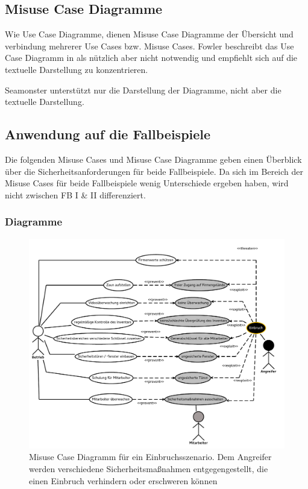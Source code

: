 \subsection{Misuse Case Diagramme}
Wie Use Case Diagramme, dienen Misuse Case Diagramme der Übersicht und verbindung mehrerer Use Cases bzw. Misuse Cases. Fowler beschreibt das Use Case Diagramm in \cite{fowler2004uml} als nützlich aber nicht notwendig und empfiehlt sich auf die textuelle Darstellung zu konzentrieren. 

Seamonster unterstützt nur die Darstellung der Diagramme, nicht aber die textuelle Darstellung.

\subsection{Anwendung auf die Fallbeispiele}
Die folgenden Misuse Cases und Misuse Case Diagramme geben einen Überblick über die Sicherheitsanforderungen für beide Fallbeispiele. Da sich im Bereich der Misuse Cases für beide Fallbeispiele wenig Unterschiede ergeben haben, wird nicht zwischen FB I \& II differenziert.

\subsubsection{Diagramme}

\begin{figure}
\includegraphics[scale=0.8,angle=90]{images/MisUseCaseEinbruch.pdf} 
\caption{Misuse Case Diagramm für ein Einbruchsszenario. Dem Angreifer werden verschiedene Sicherheitsmaßnahmen entgegengestellt, die einen Einbruch verhindern oder erschweren können}
\end{figure}

